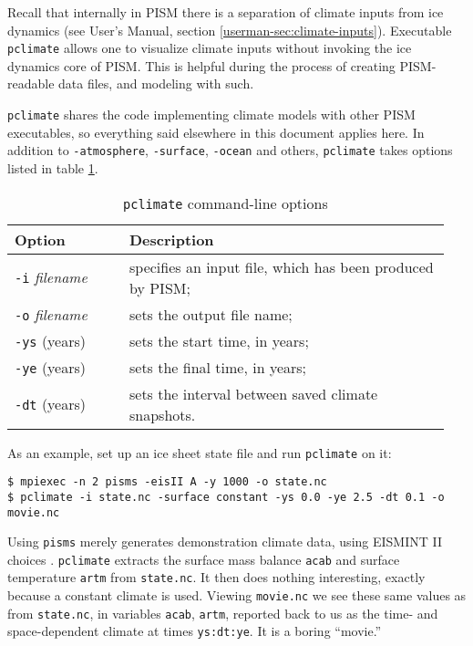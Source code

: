 \documentclass[titlepage,letterpaper,final]{scrartcl}
\newcommand{\txtopt}[2]{\texttt{-#1} #2\optindex{\texttt{-#1} #2}}
\newcommand{\fileopt}[1]{\txtopt{#1}{\emph{filename}}}
\begin{document}
Recall that internally in PISM there is a separation of climate inputs from ice
dynamics (see User's Manual, section \ref*{userman-sec:climate-inputs}). Executable
\texttt{pclimate}  allows one to visualize climate inputs without
invoking the ice dynamics core of PISM. This is helpful during the process of
creating PISM-readable data files, and modeling with such.

\texttt{pclimate} shares the code implementing climate models with other PISM
executables, so everything said elsewhere in this document  applies
here. In addition to \texttt{-atmosphere}, \texttt{-surface}, \texttt{-ocean}
and others, \texttt{pclimate} takes options listed in table \ref{tab:pclimate}.

\begin{table}[ht]
  \centering
  \caption{\texttt{pclimate} command-line options}
  \begin{tabular}{p{0.25\linewidth}p{0.7\linewidth}}\toprule
    \textbf{Option} & \textbf{Description}\\
    \midrule
    \fileopt{i} & specifies an input file, which has been produced by PISM;\\
    \fileopt{o} & sets the output file name;\\
    \txtopt{ys}{(years)} & sets the start time, in years;\\
    \txtopt{ye}{(years)} & sets the final time, in years;\\
    \txtopt{dt}{(years)} & sets the interval between saved climate snapshots.\\
    \bottomrule
 \end{tabular}
 \label{tab:pclimate}
\end{table}

\bigskip
As an example, set up an ice sheet state file and run \texttt{pclimate} on it:
\begin{verbatim}
$ mpiexec -n 2 pisms -eisII A -y 1000 -o state.nc
$ pclimate -i state.nc -surface constant -ys 0.0 -ye 2.5 -dt 0.1 -o movie.nc
\end{verbatim}
Using \texttt{pisms} merely generates demonstration climate data, using
EISMINT II choices \cite{EISMINT00}.  \texttt{pclimate} extracts the 
surface mass balance \texttt{acab} and surface temperature \texttt{artm} from \texttt{state.nc}.
It then does nothing interesting, exactly because a constant climate
is used.  Viewing \texttt{movie.nc} we see these same values as from \texttt{state.nc},
in variables \texttt{acab}, \texttt{artm}, reported back to us as the time- and space-dependent
climate at times \texttt{ys:dt:ye}.  It is a boring ``movie.''
\end{document}
